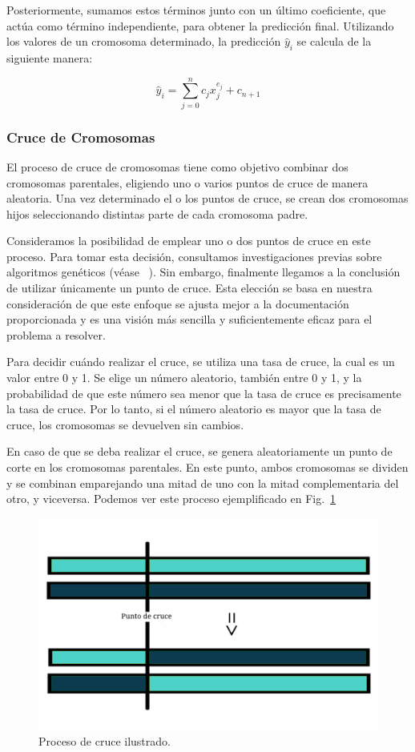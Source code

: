 \documentclass[conference,a4paper]{IEEEtran}
\def\figurename{Fig.}
\begin{document}
Posteriormente, sumamos estos términos junto con un último coeficiente, que actúa como término independiente, para obtener la predicción final. Utilizando los valores de un cromosoma determinado, la predicción \(\hat{y}_i\) se calcula de la siguiente manera:

\[
\hat{y}_i = \sum_{j=0}^{n} c_j x_j^{e_j} + c_{n+1}
\]


\subsubsection{Cruce de Cromosomas}
El proceso de cruce de cromosomas tiene como objetivo combinar dos cromosomas parentales, eligiendo uno o varios puntos de cruce de manera aleatoria. Una vez determinado el o los puntos de cruce, se crean dos cromosomas hijos seleccionando distintas parte de cada cromosoma padre. 

Consideramos la posibilidad de emplear uno o dos puntos de cruce en este proceso. Para tomar esta decisión, consultamos investigaciones previas sobre algoritmos genéticos (véase ~\cite{b1}). Sin embargo, finalmente llegamos a la conclusión de utilizar únicamente un punto de cruce. Esta elección se basa en nuestra consideración de que este enfoque se ajusta mejor a la documentación proporcionada y es una visión más sencilla y suficientemente eficaz para el problema a resolver.

Para decidir cuándo realizar el cruce, se utiliza una tasa de cruce, la cual es un valor entre 0 y 1. Se elige un número aleatorio, también entre 0 y 1, y la probabilidad de que este número sea menor que la tasa de cruce es precisamente la tasa de cruce. Por lo tanto, si el número aleatorio es mayor que la tasa de cruce, los cromosomas se devuelven sin cambios. 

En caso de que se deba realizar el cruce, se genera aleatoriamente un punto de corte en los cromosomas parentales. En este punto, ambos cromosomas se dividen y se combinan emparejando una mitad de uno con la mitad complementaria del otro, y viceversa. Podemos ver este proceso ejemplificado en \figurename~\ref{fig:chromosome-crossover}


\begin{figure}[h]
    \centering
    \includegraphics[width=\columnwidth]{image-chromosome-crossover.jpg}
    \caption{Proceso de cruce ilustrado.}
    \label{fig:chromosome-crossover}
\end{figure}
\end{document}
